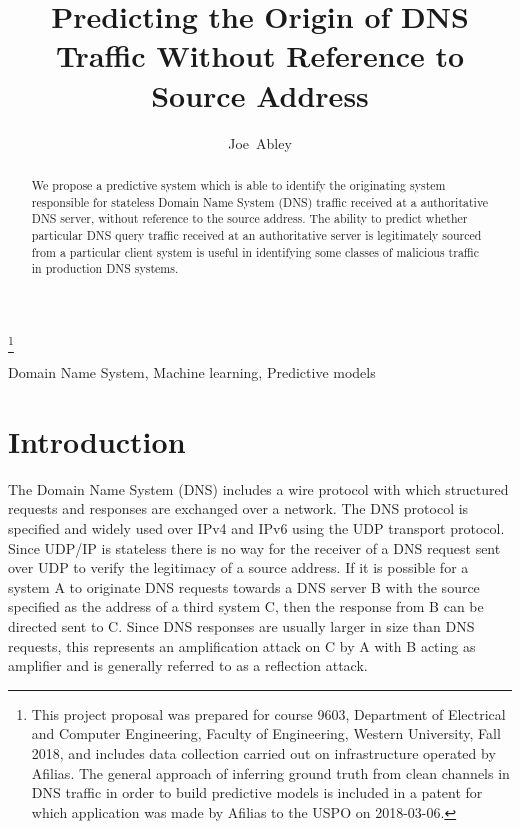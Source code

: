 \documentclass[9pt,technote,letterpaper]{IEEEtran}
\begin{document}
\title{Predicting the Origin of DNS Traffic Without Reference to Source Address}

\author{Joe~Abley}
\thanks{This project proposal was prepared for course 9603, Department of Electrical and Computer Engineering, Faculty of Engineering, Western University, Fall 2018, and includes data collection carried out on infrastructure operated by Afilias. The general approach of inferring ground truth from clean channels in DNS traffic in order to build predictive models is included in a patent for which application was made by Afilias to the USPO on 2018-03-06.}

\pagestyle{headings}

\begin{abstract}
We propose a predictive system which is able to identify the originating system responsible for stateless Domain Name System (DNS) traffic received at a authoritative DNS server, without reference to the source address. The ability to predict whether particular DNS query traffic received at an authoritative server is legitimately sourced from a particular client system is useful in identifying some classes of malicious traffic in production DNS systems.
\end{abstract}

\begin{IEEEkeywords}
Domain Name System, Machine learning, Predictive models
\end{IEEEkeywords}

\maketitle

\section{Introduction}
The Domain Name System (DNS)\cite{RFC1034} includes a wire protocol\cite{RFC1035} with which structured requests and responses are exchanged over a network. The DNS protocol is specified and widely used over IPv4 and IPv6 using the UDP transport protocol. Since UDP/IP is stateless there is no way for the receiver of a DNS request sent over UDP to verify the legitimacy of a source address. If it is possible for a system A to originate DNS requests towards a DNS server B with the source specified as the address of a third system C, then the response from B can be directed sent to C. Since DNS responses are usually larger in size than DNS requests, this represents an amplification attack on C by A with B acting as amplifier and is generally referred to as a reflection attack\cite{RFC5358}.
\end{document}
